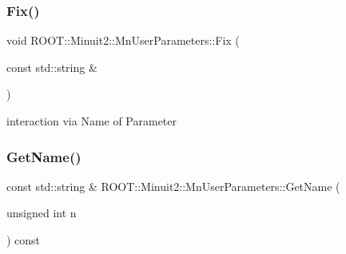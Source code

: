 \subsubsection{\texorpdfstring{Fix()}{Fix()}\hspace{0.1cm}{\footnotesize\ttfamily [6/6]}}
{\footnotesize\ttfamily void R\+O\+O\+T\+::\+Minuit2\+::\+Mn\+User\+Parameters\+::\+Fix (\begin{DoxyParamCaption}\item[{const std\+::string \&}]{ }\end{DoxyParamCaption})}



interaction via Name of Parameter 

\mbox{\label{classROOT_1_1Minuit2_1_1MnUserParameters_a83594fef03edc5f0948e05a290e67fc2}} 
\subsubsection{\texorpdfstring{GetName()}{GetName()}\hspace{0.1cm}{\footnotesize\ttfamily [1/3]}}
{\footnotesize\ttfamily const std\+::string \& R\+O\+O\+T\+::\+Minuit2\+::\+Mn\+User\+Parameters\+::\+Get\+Name (\begin{DoxyParamCaption}\item[{unsigned int}]{n }\end{DoxyParamCaption}) const}

